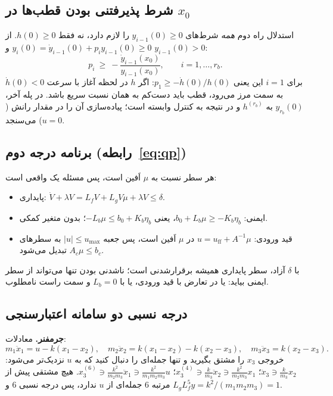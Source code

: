 \documentclass[10pt,twocolumn]{article}
\newcommand{\en}[1]{\lr{#1}}
\newcommand{\nd}{\lr{\textendash}}
\begin{document}
\subsection{شرط پذیرفتنی بودن قطب‌ها در $x_0$}
استدلال راه دوم \emph{همه} شرط‌های $y_{i-1}(0)\ge0$ را لازم دارد، نه فقط $h(0)\ge0$. از
$y_i(0)=\dot y_{i-1}(0)+p_iy_{i-1}(0)\ge0$ و $y_{i-1}(0)>0$:
\begin{equation*}
    p_i\ \ge\ -\frac{\dot y_{i-1}(x_0)}{y_{i-1}(x_0)},\qquad i=1,\ldots,r_b .
\end{equation*}
برای $i=1$ این یعنی $p_1\ge-\dot h(0)/h(0)$: اگر $h$ در لحظه آغاز با سرعت $\dot h(0)<0$ به سمت مرز
می‌رود، قطب باید دست‌کم به همان نسبت سریع باشد. در پله آخر، $y_{r_b}(0)$ به $h^{(r_b)}$ و در نتیجه به
کنترل وابسته است؛ پیاده‌سازی آن را در مقدار رانش ($u=0$) می‌سنجد.

\subsection{برنامه درجه دوم (رابطه~\eqref{eq:qp})}
هر سطر نسبت به $\mu$ اَفین است، پس مسئله یک \en{QP} واقعی است:
\begin{itemize}\renewcommand{\labelitemi}{\lr{\textbullet}}
    \item پایداری: $\dot V+\lambda V=L_fV+L_gV\mu+\lambda V\le\delta$.
    \item ایمنی: $b_0+L_b\mu\ge-K_b\eta_b$، یعنی $-L_b\mu\le b_0+K_b\eta_b$؛ بدون متغیر کمکی.
    \item قید ورودی: $u=u_{\mathrm{ff}}+A^{-1}\mu$ در $\mu$ اَفین است، پس جعبه $|u|\le u_{\max}$
          به سطرهای $A_c\mu\le b_c$ تبدیل می‌شود.
\end{itemize}
با $\delta$ آزاد، سطر پایداری همیشه برقرارشدنی است؛ ناشدنی بودن تنها می‌تواند از سطر ایمنی بیاید:
یا در تعارض با قید ورودی، یا با $L_b=0$ و سمت راست نامطلوب.

\subsection{درجه نسبی دو سامانه اعتبارسنجی}
\textbf{جرم\nd{}فنر.} معادلات:
\begin{equation*}
    m_1\ddot x_1=u-k(x_1-x_2),\quad
    m_2\ddot x_2=k(x_1-x_2)-k(x_2-x_3),\quad
    m_3\ddot x_3=k(x_2-x_3).
\end{equation*}
خروجی $x_3$ را مشتق بگیرید و تنها جمله‌ای را دنبال کنید که به $u$ نزدیک‌تر می‌شود:
$\ddot x_3\ni\tfrac{k}{m_3}x_2$؛ $x_3^{(4)}\ni\tfrac{k}{m_3}\ddot x_2\ni\tfrac{k^2}{m_2m_3}x_1$؛
$x_3^{(6)}\ni\tfrac{k^2}{m_2m_3}\ddot x_1\ni\tfrac{k^2}{m_1m_2m_3}u$. هیچ مشتقی پیش از مرتبه $6$ جمله‌ای از $u$
ندارد، پس درجه نسبی $6$ و $L_gL_f^5y=k^2/(m_1m_2m_3)=1$.
\end{document}
